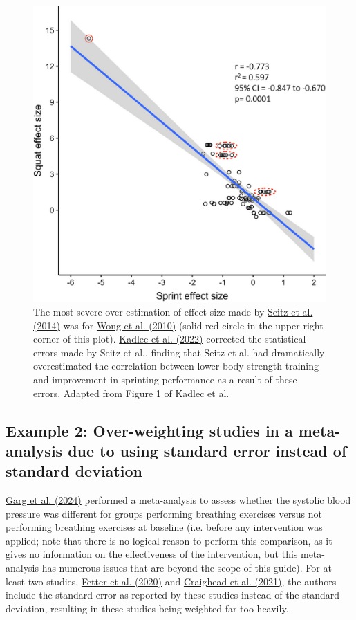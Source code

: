 \documentclass[letterpaper, 12pt]{article}
\begin{document}
\begin{figure}[h!tbp]
    \includegraphics[width=\textwidth]{img/sd_vs_se/kadlec_effect_size.png}
    \caption*{ The most severe over-estimation of effect size made by \href{https://doi.org/10.1007/s40279-014-0227-1}{Seitz et al. (2014)} was for \href{https://doi.org/10.1519/JSC.0b013e3181aa36a2}{Wong et al. (2010)} (solid red circle in the upper right corner of this plot). \href{https://doi.org/10.1007/s40279-022-01766-0}{Kadlec et al. (2022)} corrected the statistical errors made by Seitz et al., finding that Seitz et al. had dramatically overestimated the correlation between lower body strength training and improvement in sprinting performance as a result of these errors. Adapted from Figure 1 of Kadlec et al.}
\end{figure}

\pagebreak

\subsection*{Example 2: Over-weighting studies in a meta-analysis due to using standard error instead of standard deviation}

\href{https://doi.org/10.1016/j.ijcrp.2023.200232}{Garg et al. (2024)} performed a meta-analysis to assess whether the systolic blood pressure was different for groups performing breathing exercises versus not performing breathing exercises at baseline (i.e. before any intervention was applied; note that there is no logical reason to perform this comparison, as it gives no information on the effectiveness of the intervention, but this meta-analysis has numerous issues that are beyond the scope of this guide). For at least two studies, \href{https://doi.org/10.3389/fphys.2020.00898}{Fetter et al. (2020)} and \href{https://doi.org/10.1161/JAHA.121.020980}{Craighead et al. (2021)}, the authors include the standard error as reported by these studies instead of the standard deviation, resulting in these studies being weighted far too heavily.
\end{document}
